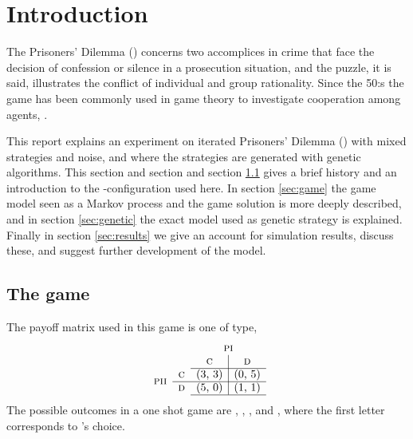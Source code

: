 \section{Introduction}\label{sec:intro}
The Prisoners' Dilemma (\pd) concerns two accomplices in crime that face the decision of confession or silence in a prosecution situation, and the puzzle, it is said, illustrates the conflict of individual and group rationality. Since the 50:s the game has been commonly used in game theory to investigate cooperation among agents, \cite{stanford:pd}.\mypar


This report explains an experiment on iterated Prisoners' Dilemma (\ipd) with mixed strategies and noise, and where the strategies are generated with genetic algorithms. This section and section and section \ref{sec:intro:game} gives a brief history and an introduction to the \pd-configuration used here. In section \ref{sec:game} the game model seen as a Markov process and the game solution is more deeply described, and in section \ref{sec:genetic} the exact model used as genetic strategy is explained. Finally in section \ref{sec:results} we give an account for simulation results, discuss these, and suggest further development of the model.

\subsection{The game}\label{sec:intro:game}
The payoff matrix used in this game is one of \pd type,
\begin{equation}
\begin{array}{cc c|c}
                     &            & \multicolumn{2}{c}{\pone} \\
                     &            & \textsc{c} & \textsc{d}   \\ \cline{3-4}
\multirow{2}*{\ptwo} & \textsc{c} & $(3, 3)$   & $(0, 5)$     \\ \cline{2-4}
		     & \textsc{d} & $(5, 0)$   & $(1, 1)$     \\ \cline{3-4}
\end{array}
\label{equ:intro:payoff}
\end{equation}
The possible outcomes in a one shot game are , , , and , where the first letter corresponds to \pone's choice.\mypar

